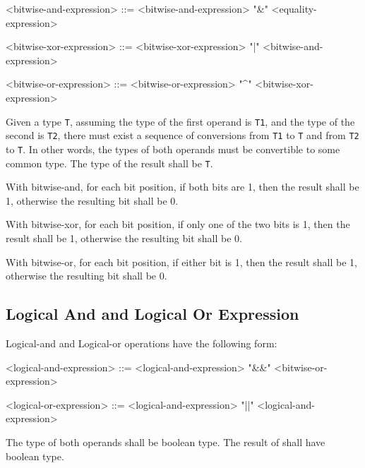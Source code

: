 \begin{minip}
\begin{grammar}
<bitwise-and-expression> ::= <bitwise-and-expression> "\&" <equality-expression>

<bitwise-xor-expression> ::= <bitwise-xor-expression> "|" <bitwise-and-expression>

<bitwise-or-expression> ::= <bitwise-or-expression> "^" <bitwise-xor-expression>
\end{grammar}
\end{minip}

Given a type \texttt{T}, assuming the type of the first operand is \texttt{T1}, and the type of the second is \texttt{T2}, there must exist a sequence of conversions from \texttt{T1} to \texttt{T} and from \texttt{T2} to \texttt{T}. In other words, the types of both operands must be convertible to some common type. The type of the result shall be \texttt{T}.

With bitwise-and, for each bit position, if both bits are 1, then the result shall be 1, otherwise the resulting bit shall be 0. 

With bitwise-xor, for each bit position, if only one of the two bits is 1, then the result shall be 1, otherwise the resulting bit shall be 0.

With bitwise-or, for each bit position, if either bit is 1, then the result shall be 1, otherwise the resulting bit shall be 0.

\subsection{Logical And and Logical Or Expression} \label{guide:logical_expr}

Logical-and and Logical-or operations have the following form:

\begin{minip}
\begin{grammar}
<logical-and-expression> ::= <logical-and-expression> "\&\&" <bitwise-or-expression>

<logical-or-expression> ::= <logical-and-expression> "||" <logical-and-expression>
\end{grammar}
\end{minip}

The type of both operands shall be boolean type. The result of shall have boolean type.

